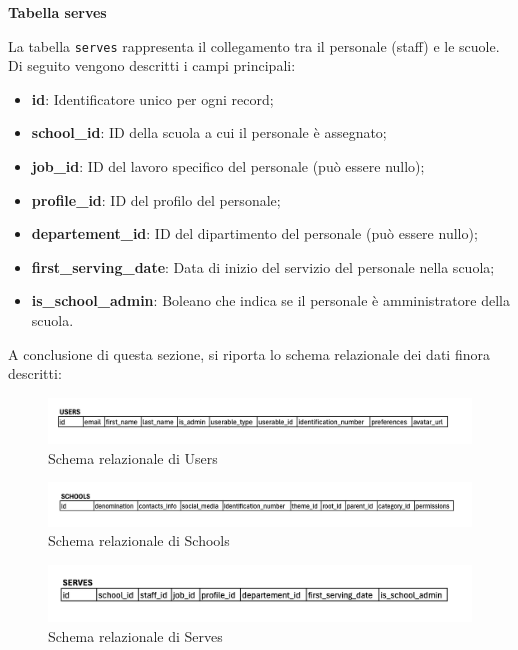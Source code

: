 \documentclass[a4paper, 12pt]{book}
\begin{document}
\textbf{Tabella serves}

La tabella \texttt{serves} rappresenta il collegamento tra il personale (staff) e le scuole.
Di seguito vengono descritti i campi principali:

\begin{itemize}
  \item \textbf{id}: Identificatore unico per ogni record;
  \item \textbf{school\_id}: ID della scuola a cui il personale è assegnato;
  \item \textbf{job\_id}: ID del lavoro specifico del personale (può essere nullo);
  \item \textbf{profile\_id}: ID del profilo del personale;
  \item \textbf{departement\_id}: ID del dipartimento del personale (può essere nullo);
  \item \textbf{first\_serving\_date}: Data di inizio del servizio del personale nella scuola;
  \item \textbf{is\_school\_admin}: Boleano che indica se il personale è amministratore della scuola.
\end{itemize}

A conclusione di questa sezione, si riporta lo schema relazionale dei dati finora descritti:

\begin{figure}[H]
  \centering
  \includegraphics[width=\textwidth]{../images/schema-relazionale-users.png}
  \caption{Schema relazionale di Users}
\end{figure}

\begin{figure}[H]
  \centering
  \includegraphics[width=\textwidth]{../images/schema-relazionale-schools.png}
  \caption{Schema relazionale di Schools}
\end{figure}

\begin{figure}[H]
  \centering
  \includegraphics[width=\textwidth]{../images/schema-relazionale-serves.png}
  \caption{Schema relazionale di Serves}
\end{figure}
\end{document}
